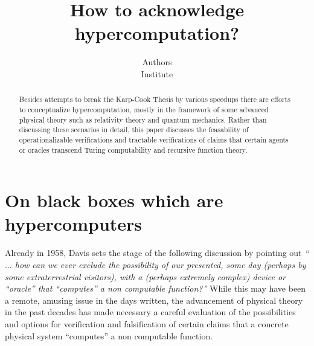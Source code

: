 \RequirePackage{graphicx}


\sloppy



\title{How to acknowledge hypercomputation?}
\author{Authors\\
 {\small Institute}}
\date{ }
\maketitle


\begin{abstract}
Besides attempts to break the Karp-Cook Thesis by various speedups
there are efforts to conceptualize hypercomputation,
mostly in the framework of some advanced physical theory such as relativity theory
and quantum mechanics.
Rather than discussing these scenarios in detail,
this paper discusses the feasability of operationalizable
verifications and tractable verifications of claims
that certain agents or oracles transcend Turing computability and
recursive function theory.
\end{abstract}


\section{On black boxes which are hypercomputers}

Already in 1958, Davis \cite[p. 11]{davis-58}
sets the stage of the following discussion by pointing out
 {\em `` $\ldots$ how can we ever exclude the possibility of our
 presented,
 some day (perhaps by some extraterrestrial visitors), with a (perhaps
 extremely complex) device or ``oracle'' that ``computes'' a
 non computable function?''
 }
While this may have been a remote, amusing issue in the days written,
the advancement of physical theory in the past decades
has made necessary
a careful evaluation of the possibilities and options for
verification and falsification of certain claims that a concrete physical system
``computes''   a  non computable function.


